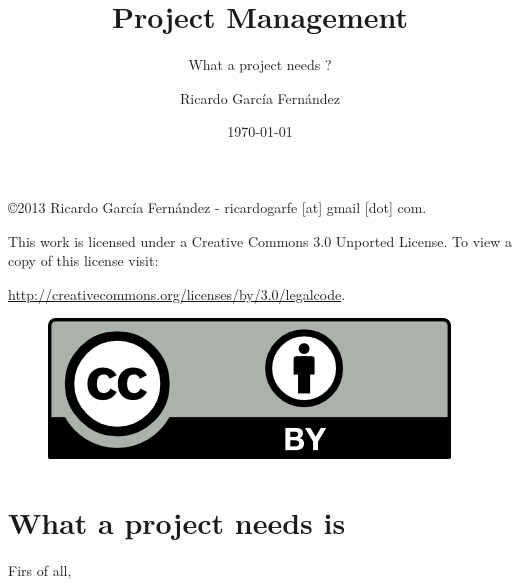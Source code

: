 \documentclass[11pt]{scrartcl}
\title{\textbf{Project Management}}
\subtitle{What a project needs ?}
\author{Ricardo Garc\'ia Fern\'andez}
\date{\today}
\begin{document}
\maketitle

\vfill

\begin{flushright}
    \copyright  2013 Ricardo Garc\'ia Fern\'andez - ricardogarfe [at] gmail [dot] com.

    This work is licensed under a Creative Commons 3.0 Unported License.
    To view a copy of this license visit:
 
    \url{http://creativecommons.org/licenses/by/3.0/legalcode}.
\end{flushright}

\begin{figure}[h]
    \begin{flushright}	
        \includegraphics{by}
        \label{fig:by}
    \end{flushright}
\end{figure}

\newpage

\section{What a project needs is}

Firs of all, 
\end{document}
